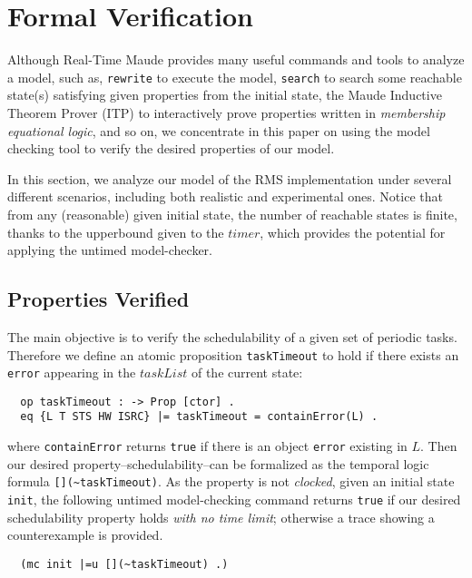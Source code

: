 \documentclass{llncs}
\begin{document}
\section{Formal Verification}
\label{s:verification}
Although Real-Time Maude provides many useful commands and tools to
analyze a model, such as, \verb|rewrite| to execute the model,
\verb|search| to search some reachable state(s) satisfying given
properties from the initial state, the Maude Inductive Theorem Prover
(ITP) to interactively prove properties written in \emph{membership
  equational logic}, and so on, we concentrate in this paper on using
the model checking tool to verify the desired properties of our model.

In this section, we analyze our model of the RMS implementation under
several different scenarios, including both realistic and experimental
ones. Notice that from any (reasonable) given initial state, the
number of reachable states is finite, thanks to the upperbound given
to the $timer$, which provides the potential for applying the untimed
model-checker.

\subsection{Properties Verified}
The main objective is to verify the schedulability of a given set of
periodic tasks. Therefore we define an atomic proposition
\verb|taskTimeout| to hold if there exists an \verb|error| appearing
in the $taskList$ of the current state:
\begin{verbatim}
  op taskTimeout : -> Prop [ctor] .
  eq {L T STS HW ISRC} |= taskTimeout = containError(L) .
\end{verbatim}
where \verb|containError| returns \verb|true| if there is an object
\verb|error| existing in $L$. Then our desired
property--schedulability--can be formalized as the temporal logic
formula \verb|[](~taskTimeout)|. As the property is not
\emph{clocked}, given an initial state \verb|init|, the following
untimed model-checking command returns \verb|true| if our desired
schedulability property holds \emph{with no time limit}; otherwise 
a trace showing a counterexample is provided.
\begin{verbatim}
  (mc init |=u [](~taskTimeout) .)
\end{verbatim}
\end{document}
